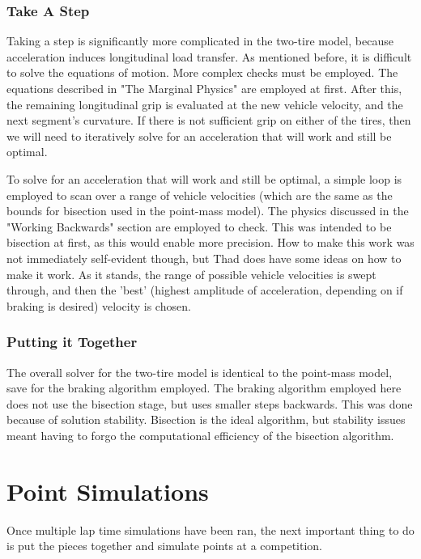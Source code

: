 \documentclass{article}
\begin{document}
\subsubsection{Take A Step}

Taking a step is significantly more complicated in the two-tire model, because acceleration induces longitudinal load transfer. As mentioned before, it is difficult to solve the equations of motion. More complex checks must be employed. The equations described in "The Marginal Physics" are employed at first. After this, the remaining longitudinal grip is evaluated at the new vehicle velocity, and the next segment's curvature. If there is not sufficient grip on either of the tires, then we will need to iteratively solve for an acceleration that will work and still be optimal.

To solve for an acceleration that will work and still be optimal, a simple loop is employed to scan over a range of vehicle velocities (which are the same as the bounds for bisection used in the point-mass model). The physics discussed in the "Working Backwards" section are employed to check. This was intended to be bisection at first, as this would enable more precision. How to make this work was not immediately self-evident though, but Thad does have some ideas on how to make it work. As it stands, the range of possible vehicle velocities is swept through, and then the 'best' (highest amplitude of acceleration, depending on if braking is desired) velocity is chosen.

\subsubsection{Putting it Together}

The overall solver for the two-tire model is identical to the point-mass model, save for the braking algorithm employed. The braking algorithm employed here does not use the bisection stage, but uses smaller steps backwards. This was done because of solution stability. Bisection is the ideal algorithm, but stability issues meant having to forgo the computational efficiency of the bisection algorithm.

\section{Point Simulations}

Once multiple lap time simulations have been ran, the next important thing to do is put the pieces together and simulate points at a competition.
\end{document}
